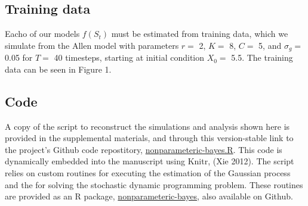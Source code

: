 \documentclass[author-year, review]{elsarticle} %
\newenvironment{Shaded}{}{}
\newcommand{\KeywordTok}[1]{\textcolor[rgb]{0.00,0.44,0.13}{\textbf{{#1}}}}
\newcommand{\DataTypeTok}[1]{\textcolor[rgb]{0.56,0.13,0.00}{{#1}}}
\newcommand{\DecValTok}[1]{\textcolor[rgb]{0.25,0.63,0.44}{{#1}}}
\newcommand{\StringTok}[1]{\textcolor[rgb]{0.25,0.44,0.63}{{#1}}}
\newcommand{\CommentTok}[1]{\textcolor[rgb]{0.38,0.63,0.69}{\textit{{#1}}}}
\newcommand{\NormalTok}[1]{{#1}}
\begin{document}
\begin{Shaded}
\end{Shaded}

\subsection{Training data}\label{training-data}

Eacho of our models $f(S_t)$ must be estimated from training data, which
we simulate from the Allen model with parameters $r = $ 2, $K =$ 8,
$C =$ 5, and $\sigma_g =$ 0.05 for $T=$ 40 timesteps, starting at
initial condition $X_0 = $ 5.5. The training data can be seen in Figure
1.

\subsection{Code}\label{code}

A copy of the script to reconstruct the simulations and analysis shown
here is provided in the supplemental materials, and through this
version-stable link to the project's Github code repostitory,
\href{}{nonparameteric-bayes.R}. This code is dynamically embedded into
the manuscript using Knitr, (Xie 2012). The script relies on custom
routines for executing the estimation of the Gaussian process and the
for solving the stochastic dynamic programming problem. These routines
are provided as an R package, \href{}{nonparameteric-bayes}, also
available on Github.
\end{document}
